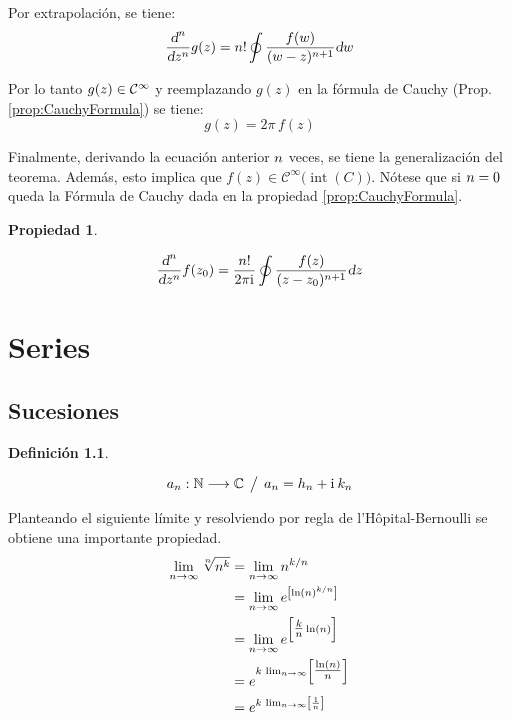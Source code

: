 \documentclass[a5paper,12pt,twoside]{book}
\newtheorem{defn}{{Definición}}[chapter]
\newtheorem{prop}{{Propiedad}}[chapter]
\begin{document}
Por extrapolación, se tiene:
\begin{equation*}
    \frac{\dif^\nth}{\dif z^\nth} g(z) = \nth! \oint \frac{f(w)}{(w-z)^{\nth+1}} \dif w
\end{equation*}

Por lo tanto $g(z) \in \class[\infty]$ y reemplazando $g(z)$ en la fórmula de Cauchy (Prop. \ref{prop:CauchyFormula}) se tiene:
\begin{equation*}
    g(z) = 2 \pi \, f(z)
\end{equation*}

Finalmente, derivando la ecuación anterior $\nth$ veces, se tiene la generalización del teorema. Además, esto implica que $f(z) \in \mathcal{C} ^ \infty \big( \operatorname{int}(C) \big)$. Nótese que si $\nth=0$ queda la Fórmula de Cauchy dada en la propiedad \ref{prop:CauchyFormula}.

\begin{mdframed}[style=MyFrame1]
    \begin{prop}
    \end{prop}
    \begin{equation*}
        \frac{\dif^\nth}{\dif z^\nth} f(z_0) = \frac{\nth!}{2 \pi \iu} \oint \frac{f(z)}{(z-z_0)^{\nth+1}} \dif z
    \end{equation*}
\end{mdframed}


\chapter{Series}


\section{Sucesiones}

\begin{mdframed}[style=MyFrame1]
    \begin{defn}
    \end{defn}
    \begin{equation*}
        a_\nth: \setN \longrightarrow \setC \tq a_\nth = h_\nth + \iu \, k_\nth
    \end{equation*}
\end{mdframed}

Planteando el siguiente límite y resolviendo por regla de l'Hôpital-Bernoulli se obtiene una importante propiedad.
\begin{align*}
    \lim_{\nth\to\infty} \sqrt[\nth]{\nth^\kth}
    &= \lim_{\nth\to\infty} \nth^{\kth/\nth}
    \\
    &= \lim_{\nth\to\infty} e^{\left[ \ln(\nth)^{\kth/\nth} \right]}
    \\
    &= \lim_{n\to\infty} e^{\left[ \tfrac{\kth}{\nth} \ln(n) \right]}
    \\
    &= e^{\kth \, \lim_{\nth\to\infty} \left[ \tfrac{\ln(\nth)}{\nth} \right]}
    \\
    &= e^{\kth \, \lim_{\nth\to\infty} \left[ \frac{1}{\nth} \right]}
\end{align*}
\end{document}
